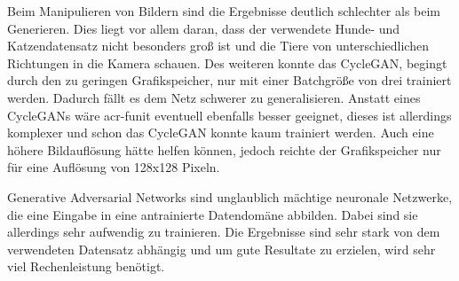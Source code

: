 Beim Manipulieren von Bildern sind die Ergebnisse deutlich schlechter als beim Generieren. 
Dies liegt vor allem daran, dass der verwendete Hunde- und Katzendatensatz nicht 
besonders groß ist und die Tiere von unterschiedlichen Richtungen in die Kamera schauen. 
Des weiteren konnte das CycleGAN, begingt durch den zu geringen Grafikspeicher, nur mit einer Batchgröße von drei 
trainiert werden. Dadurch fällt es dem Netz schwerer zu generalisieren. Anstatt eines 
CycleGANs wäre \gls{acr-funit} eventuell ebenfalls besser geeignet, dieses ist allerdings 
komplexer und schon das CycleGAN konnte kaum trainiert werden. Auch eine höhere 
Bildauflösung hätte helfen können, jedoch reichte der Grafikspeicher nur für eine 
Auflösung von 128x128 Pixeln.

Generative Adversarial Networks sind unglaublich mächtige neuronale Netzwerke, die eine Eingabe in eine 
antrainierte Datendomäne abbilden. Dabei sind sie allerdings sehr aufwendig zu trainieren.
Die Ergebnisse sind sehr stark von dem verwendeten Datensatz abhängig und um 
gute Resultate zu erzielen, wird sehr viel Rechenleistung benötigt.






